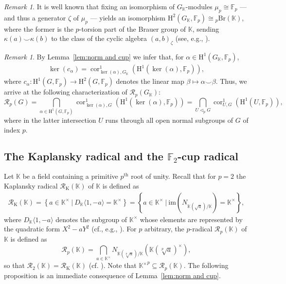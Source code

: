 \documentclass{amsart}
\theoremstyle{definition}
\theoremstyle{remark}
\newtheorem{rem}[thm]{Remark}
\DeclareMathOperator{\cores}{cor}
\newcommand{\KK}{\mathbb{K}}
\newcommand{\FF}{\mathbb{F}}
\newcommand{\calR}{\mathcal{R}}
\newcommand{\rmH}{\mathrm H}%
\newcommand{\set}[2]{\left\lbrace{#1}\ \big\vert\ {#2}\right\rbrace}
\newcommand{\F}{\FF}
\begin{document}
\begin{rem}
    \label{rem:Brauer group and cup product}
{ It is well known that fixing an isomorphism of $G_{\KK}$-modules $\mu_p\cong\F_p$ --- and thus a generator $\zeta$ of $\mu_p$ --- yields an isomorphism $\rmH^2(G_{\KK},\F_p)\cong{}_p\mathrm{Br}(\KK)$, where the former is the $p$-torsion part of the Brauer group of $\KK$, sending $\kappa(a)\smallsmile\kappa(b)$ to the class of the cyclic algebra $(a,b)_\zeta$ (see, e.g., \cite[Prop.~4.7.1]{GilleSzamuely}).} 
\end{rem}


\begin{rem}    \label{rem:RpG intersection cores}
By Lemma~\ref{lem:norm and cup} we infer that, for $\alpha\in \rmH^1(G_\KK,\FF_p)$,
    \begin{align*}
        \ker(c_\alpha)= \cores_{\ker(\alpha),G_{\KK}}^1(\rmH^1(\ker (\alpha),\FF_p)),
    \end{align*}
    where 
$c_\alpha\colon\rmH^1(G,\FF_p)\to\rmH^2(G,\FF_p)$ denotes the linear map $\beta\mapsto\alpha\smallsmile\beta$. Thus, we arrive at the following characterization of $\calR_p(G_\KK)$:
\begin{equation*}
    \calR_p(G) =
\bigcap_{\alpha\in\rmH^1(G,\FF_p)}\cores_{\ker(\alpha),G}^1(\rmH^1(\ker(\alpha),\FF_p))=
\bigcap_{U\lhd_p G}\cores_{U,G}^1(\rmH^1(U,\FF_p)),
\end{equation*}
where in the latter intersection $U$ runs through all open normal subgroups of $G$ of index $p$.
\end{rem}


\subsection{The Kaplansky radical and the \texorpdfstring{$\FF_2$}{}-cup radical}
\label{ssec:Traditional radical and F2 cup radical}

Let $\KK$ be a field { containing a primitive $p^{\mathrm{th}}$ root of unity}.
Recall that for $p=2$ the Kaplansky radical ${\calR}_{\mathrm{K}}(\KK)$ of $\KK$ is defined as
\begin{align*}
    {\calR}_{\mathrm{K}}(\KK)=\set{a\in \KK^\times}{ D_\KK\langle 1,-a\rangle =\KK^\times}=\set{a\in \KK^\times}{ \mathrm{im}(N_{\KK(\sqrt{a})/\KK}) =\KK^\times},
\end{align*}
where $D_\KK\langle 1,-a\rangle$ denotes the subgroup of $\KK^\times$ whose elements are represented by the quadratic form $X^2-aY^2$ (cf., e.g., \cite{Lam2005,Kaplansky}). 
{ 
For $p$ arbitrary, the $p$-radical $\calR_p(\KK)$ of $\KK$ is defined as
\[
\calR_p(\KK)=\bigcap_{a\in\KK^\times} N_{\KK(\sqrt[p]{a})/\KK}\left(\KK(\sqrt[p]{a})^\times\right),
\]
so that $\calR_2(\KK)=\calR_{\mathrm{K}}(\KK)$ (cf. \cite[\S~1]{DarioEngler}).}
Note that {${\KK^{\times}}^p\subseteq {\calR}_{p}(\KK)$}. The following proposition is an immediate consequence of Lemma~\ref{lem:norm and cup}.
\end{document}
